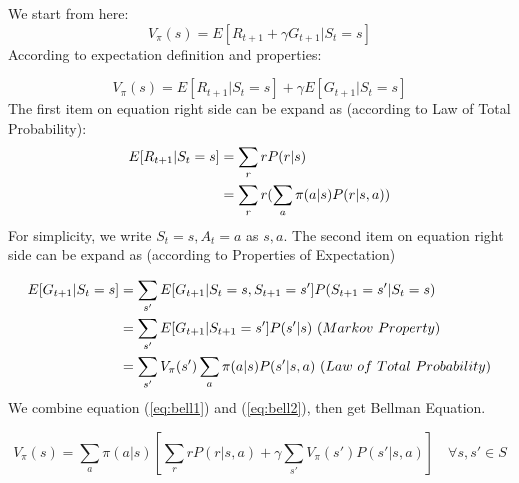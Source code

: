     \begin{definition}\label{def:BellmanEquation}
       We start from here:
       \begin{equation*} 
            V_{\pi}(s)=E[R_{t+1}+\gamma G_{t+1}|S_t=s]
       \end{equation*}
       According to expectation definition and properties:

       \begin{equation*}
            V_{\pi}(s)=E[R_{t+1}|S_t=s]+\gamma E[G_{t+1}|S_t=s]
       \end{equation*}
       The first item on equation right side can be expand as (according to Law of Total Probability):
       \begin{align}\label{eq:bell1}
            E[R_{t+1}|S_t=s] & = \sum_{r}rP(r|s) \notag \\
                             & = \sum_{r}r(\sum_{a}\pi(a|s)P(r|s,a)) 
       \end{align}
       For simplicity, we write $S_{t}=s, A_{t}=a$ as $s, a$.
       The second item on equation right side can be expand as (according to Properties of Expectation)

       \begin{align}\label{eq:bell2}
            E[G_{t+1}|S_{t}=s] & = \sum_{s'}E[G_{t+1}|S_{t}=s, S_{t+1}=s']P(S_{t+1}=s'|S_{t}=s) \notag \\
                               & = \sum_{s'}E[G_{t+1}|S_{t+1}=s']P(s'|s) \ (Markov\ Property) \notag \\
                               & = \sum_{s'}V_{\pi}(s')\sum_{a}\pi(a|s)P(s'|s,a) \ (Law\ of\ Total\ Probability)
       \end{align}
       We combine equation (\ref{eq:bell1}) and (\ref{eq:bell2}), then get Bellman Equation.

       \begin{equation*}
            V_{\pi}(s)=\sum_{a}\pi(a|s)\left[\sum_{r}rP(r|s,a)+\gamma\sum_{s'}V_{\pi}(s')P(s'|s,a)\right] \quad\forall s,s' \in S
       \end{equation*}
    \end{definition}

